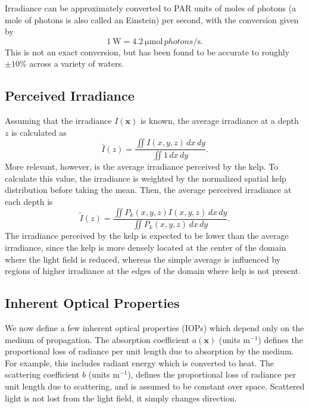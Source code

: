 \documentclass[ms,cpyr,lof,lot]{uathesis}
\renewcommand\vec\bm
\begin{document}
Irradiance can be approximately converted to PAR units of moles of photons (a mole of photons is also called an Einstein) per second, with the conversion \cite{mobley_light_1994} given by
\begin{equation}
  \SI{1}{\W} = \SI{4.2}{\micro\mole \,photons\per\second}.
  \label{eqn:watts_photons}
\end{equation}
This is not an exact conversion, but has been found to be accurate to roughly $\pm10\%$ across a variety of waters.

\subsection{Perceived Irradiance}
\label{sec:perceived_irrad}
Assuming that the irradiance $I(\vec{x})$ is known,
the average irradiance at a depth $z$ is calculated as
\begin{equation*}
  \bar{I}(z) = \frac{\iint I(x,y,z)\, dx\, dy}{\iint 1\, dx\, dy}.
\end{equation*}
More relevant, however, is the average irradiance perceived by the kelp.
To calculate this value, the irradiance is weighted by the
normalized spatial kelp distribution before taking the mean.
Then, the average perceived irradiance at each depth is
\newcommand{\Iperk}{\tilde{I}}
\begin{equation*}
   \Iperk(z) = \frac{\iint P_k(x,y,z)I(x,y,z)\, dx\, dy}{\iint P_k(x,y,z)\, dx\, dy}.
\end{equation*}
The irradiance perceived by the kelp is expected to be lower than the average irradiance,
since the kelp is more densely located at the center of the domain where the light field is reduced,
whereas the simple average is influenced by regions of higher irradiance at the edges of the domain where kelp is not present.

\subsection{Inherent Optical Properties}
\label{sec:iops}
We now define a few inherent optical properties (IOPs) which depend only on the medium of propagation.
The absorption coefficient $a(\vec{x})$ (units m$^{-1}$) defines the
proportional loss of radiance per unit length due to absorption by the medium.
For example, this includes radiant energy which is converted to heat.
The scattering coefficient $b$ (units m$^{-1}$), defines the proportional loss
of radiance per unit length due to scattering, and is assumed to be constant over space.
Scattered light is not lost from the light field, it simply changes direction.
\end{document}
